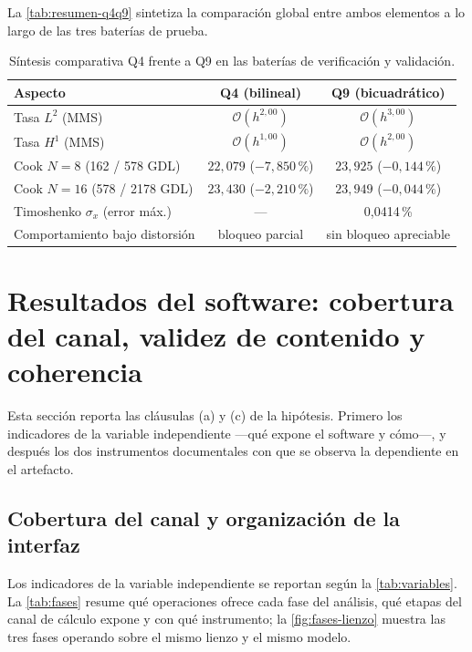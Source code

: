 La \autoref{tab:resumen-q4q9} sintetiza la comparación global entre ambos elementos a lo largo de las tres baterías de prueba.

\begin{table}[htbp]
\centering
\caption{Síntesis comparativa Q4 frente a Q9 en las baterías de verificación y validación.}
\label{tab:resumen-q4q9}
\begin{tabular}{l c c}
\hline
Aspecto & Q4 (bilineal) & Q9 (bicuadrático) \\
\hline
Tasa $L^2$ (MMS)              & $\mathcal{O}(h^{2{,}00})$ & $\mathcal{O}(h^{3{,}00})$ \\
Tasa $H^1$ (MMS)              & $\mathcal{O}(h^{1{,}00})$ & $\mathcal{O}(h^{2{,}00})$ \\
Cook $N=8$ (162 / 578 GDL)    & $22{,}079$ ($-7{,}850\,\%$) & $23{,}925$ ($-0{,}144\,\%$) \\
Cook $N=16$ (578 / 2178 GDL)  & $23{,}430$ ($-2{,}210\,\%$) & $23{,}949$ ($-0{,}044\,\%$) \\
Timoshenko $\sigma_x$ (error máx.) & --- & 0,0414\,\% \\
Comportamiento bajo distorsión & bloqueo parcial & sin bloqueo apreciable \\
\hline
\end{tabular}
{\singlespacing{}}
\end{table}

\section{Resultados del software: cobertura del canal, validez de contenido y coherencia}
\label{sec:cobertura}

Esta sección reporta las cláusulas (a) y (c) de la hipótesis. Primero los indicadores de la variable independiente —qué expone el software y cómo—, y después los dos instrumentos documentales con que se observa la dependiente en el artefacto.

\subsection{Cobertura del canal y organización de la interfaz}
\label{sec:cobertura-canal}

Los indicadores de la variable independiente se reportan según la \autoref{tab:variables}. La \autoref{tab:fases} resume qué operaciones ofrece cada fase del análisis, qué etapas del canal de cálculo expone y con qué instrumento; la \autoref{fig:fases-lienzo} muestra las tres fases operando sobre el mismo lienzo y el mismo modelo.

